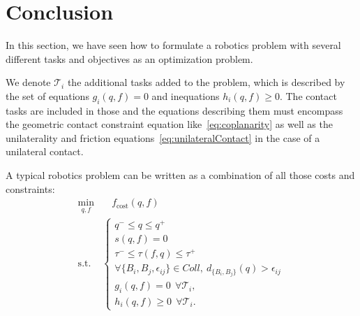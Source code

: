 \section{Conclusion}
\label{sec:Ch1_Conclusion}


In this section, we have seen how to formulate a robotics problem with several different tasks and objectives as an optimization problem.

We denote $\mathcal{T}_i$ the additional tasks added to the problem, which is described by the set of equations $g_i(q,f) = 0$ and inequations $h_i(q,f) \geq 0$.
The contact tasks are included in those and the equations describing them must encompass the geometric contact constraint equation like~\ref{eq:coplanarity} as well as the unilaterality and friction equations~\ref{eq:unilateralContact} in the case of a unilateral contact.

A typical robotics problem can be written as a combination of all those costs and constraints:
\begin{align}
\min_{q, f} & \quad f_\text{cost}(q,f) \nonumber\\
\text{s.t.}&
\left\{
\begin{array}{lr}
q^- \le q \le q^+\\
s(q,f) = 0 \\
\tau^- \le \tau(f,q) \le \tau^+\\
\forall \{B_i, B_j, \epsilon_{ij}\} \in Coll,\ d_{\{B_i, B_j\}}(q) > \epsilon_{ij}\\
g_i(q,f) = 0\ \ \forall\mathcal{T}_i,\\
h_i(q,f) \geq 0\ \ \forall\mathcal{T}_i.
\end{array}\right.
\label{eq:PG}
\end{align}

